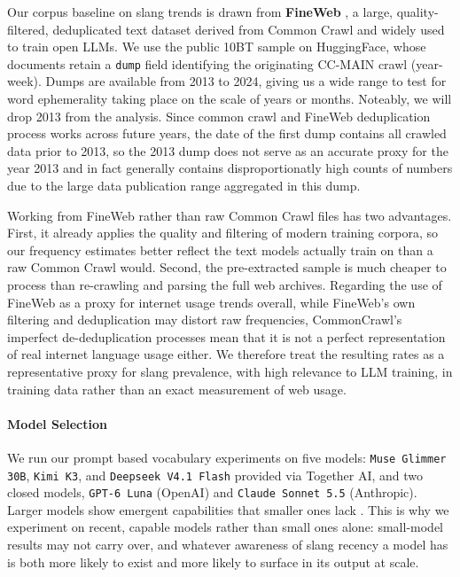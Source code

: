 \documentclass[11pt]{article}
\begin{document}
Our corpus baseline on slang trends is drawn from \textbf{FineWeb} \citep{penedo2024the}, a large, quality-filtered, deduplicated text dataset derived from Common Crawl and widely used to train open LLMs. We use the public 10BT sample on HuggingFace, whose documents retain a \texttt{dump} field identifying the originating CC-MAIN crawl (year-week). Dumps are available from 2013 to 2024, giving us a wide range to test for word ephemerality taking place on the scale of years or months. Noteably, we will drop 2013 from the analysis. Since common crawl and FineWeb deduplication process works across future years, the date of the first dump contains all crawled data prior to 2013, so the 2013 dump does not serve as an accurate proxy for the year 2013 and in fact generally contains disproportionatly high counts of numbers due to the large data publication range aggregated in this dump.

Working from FineWeb rather than raw Common Crawl files has two advantages. First, it already applies the quality and filtering of modern training corpora, so our frequency estimates better reflect the text models actually train on than a raw Common Crawl would. Second, the pre-extracted sample is much cheaper to process than re-crawling and parsing the full web archives. Regarding the use of FineWeb as a proxy for internet usage trends overall, while FineWeb's own filtering and deduplication may distort raw frequencies, CommonCrawl's imperfect de-deduplication processes mean that it is not a perfect representation of real internet language usage either. We therefore treat the resulting rates as a representative proxy for slang prevalence, with high relevance to LLM training, in training data rather than an exact measurement of web usage.

\paragraph{Model Selection}
We run our prompt based vocabulary experiments on five models: \texttt{Muse Glimmer 30B}, \texttt{Kimi K3}, and \texttt{Deepseek V4.1 Flash} provided via Together AI, and two closed models, \texttt{GPT-6 Luna} (OpenAI) and \texttt{Claude Sonnet 5.5} (Anthropic). Larger models show emergent capabilities that smaller ones lack \citep{wei2022emergent}. This is why we experiment on recent, capable models rather than small ones alone: small-model results may not carry over, and whatever awareness of slang recency a model has is both more likely to exist and more likely to surface in its output at scale.
\end{document}
